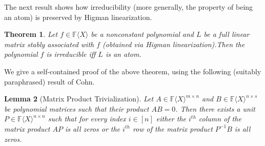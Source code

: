 \documentclass[10pt,a4paper]{article}
\newtheorem{theorem}{Theorem}[section]
\newtheorem{lemma}[theorem]{Lemma}
\newcommand{\F}{\mathbb{F}}
\renewcommand{\angle}[1]{\langle #1 \rangle}
\newcommand{\FX}{\F\angle{X}}
\newcommand{\fR}{\FX}
\begin{document}
The next result shows how irreducibility (more generally, the property
of being an atom) is preserved by Higman linearization.

\begin{theorem}\label{associates-preseve-atoms}
Let $f\in\fR$ be a nonconstant polynomial and $L$ 
%
%
  be a full linear matrix stably associated with $f$ (obtained via
Higman linearization).Then the
polynomial $f$ is irreducible iff $L$ is an atom.
%
\end{theorem}

We give a self-contained proof of the above theorem, using the
following (suitably paraphrased) result of Cohn.

\begin{lemma}[Matrix Product Trivialization]{\rm\cite[pp.~198]{Cohnintro}}\label{triv-lemma}
    Let $A\in\fR^{m\times n}$ and $B\in\fR^{n\times s}$ be polynomial
    matrices such that their product $AB=0$. Then there exists a unit
    $P\in \fR^{n\times n}$ such that for every index $i\in [n]$ either
    the $i^{th}$ column of the matrix product $AP$ is all zeros or the
    $i^{th}$ row of the matrix product $P^{-1}B$ is all zeros.
\end{lemma}    
\end{document}
